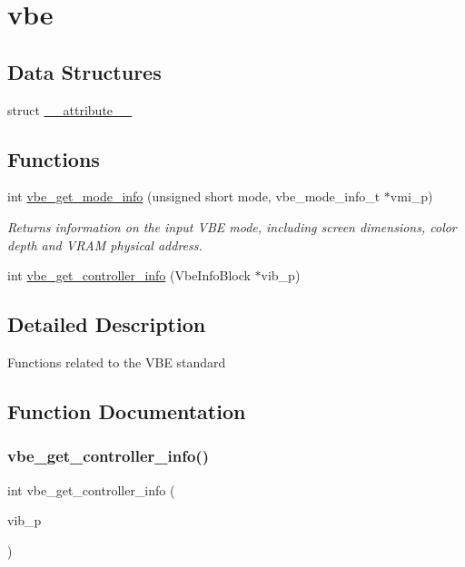 \hypertarget{group__vbe}{}\section{vbe}
\label{group__vbe}
\subsection*{Data Structures}
\begin{DoxyCompactItemize}
\item 
struct \hyperlink{struct____attribute____}{\+\_\+\+\_\+attribute\+\_\+\+\_\+}
\end{DoxyCompactItemize}
\subsection*{Functions}
\begin{DoxyCompactItemize}
\item 
int \hyperlink{group__vbe_ga4ef3234e41f2050bc094a22049b69e45}{vbe\+\_\+get\+\_\+mode\+\_\+info} (unsigned short mode, vbe\+\_\+mode\+\_\+info\+\_\+t $\ast$vmi\+\_\+p)
\begin{DoxyCompactList}\small\item\em Returns information on the input V\+BE mode, including screen dimensions, color depth and V\+R\+AM physical address. \end{DoxyCompactList}\item 
int \hyperlink{group__vbe_ga04ba27e16f8dc8fb472f6f57cf66538a}{vbe\+\_\+get\+\_\+controller\+\_\+info} (Vbe\+Info\+Block $\ast$vib\+\_\+p)
\end{DoxyCompactItemize}


\subsection{Detailed Description}
Functions related to the V\+BE standard 

\subsection{Function Documentation}
\hypertarget{group__vbe_ga04ba27e16f8dc8fb472f6f57cf66538a}{}\label{group__vbe_ga04ba27e16f8dc8fb472f6f57cf66538a} 
\subsubsection{\texorpdfstring{vbe\+\_\+get\+\_\+controller\+\_\+info()}{vbe\_get\_controller\_info()}}
{\footnotesize\ttfamily int vbe\+\_\+get\+\_\+controller\+\_\+info (\begin{DoxyParamCaption}\item[{Vbe\+Info\+Block $\ast$}]{vib\+\_\+p }\end{DoxyParamCaption})}

